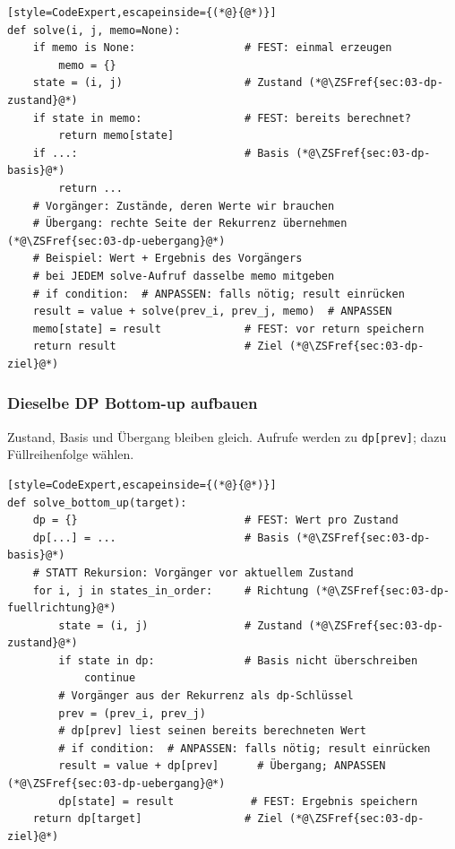 \begin{codebox}
\begin{lstlisting}[style=CodeExpert,escapeinside={(*@}{@*)}]
def solve(i, j, memo=None):
    if memo is None:                 # FEST: einmal erzeugen
        memo = {}
    state = (i, j)                   # Zustand (*@\ZSFref{sec:03-dp-zustand}@*)
    if state in memo:                # FEST: bereits berechnet?
        return memo[state]
    if ...:                          # Basis (*@\ZSFref{sec:03-dp-basis}@*)
        return ...
    # Vorgänger: Zustände, deren Werte wir brauchen
    # Übergang: rechte Seite der Rekurrenz übernehmen (*@\ZSFref{sec:03-dp-uebergang}@*)
    # Beispiel: Wert + Ergebnis des Vorgängers
    # bei JEDEM solve-Aufruf dasselbe memo mitgeben
    # if condition:  # ANPASSEN: falls nötig; result einrücken
    result = value + solve(prev_i, prev_j, memo)  # ANPASSEN
    memo[state] = result             # FEST: vor return speichern
    return result                    # Ziel (*@\ZSFref{sec:03-dp-ziel}@*)
\end{lstlisting}
\end{codebox}

\subsubsection{Dieselbe DP Bottom-up aufbauen}\label{sec:03-dp-bottom-up}

Zustand, Basis und Übergang bleiben gleich. Aufrufe werden zu \texttt{dp[prev]}; dazu Füllreihenfolge  wählen.

\begin{codebox}
\begin{lstlisting}[style=CodeExpert,escapeinside={(*@}{@*)}]
def solve_bottom_up(target):
    dp = {}                          # FEST: Wert pro Zustand
    dp[...] = ...                    # Basis (*@\ZSFref{sec:03-dp-basis}@*)
    # STATT Rekursion: Vorgänger vor aktuellem Zustand
    for i, j in states_in_order:     # Richtung (*@\ZSFref{sec:03-dp-fuellrichtung}@*)
        state = (i, j)               # Zustand (*@\ZSFref{sec:03-dp-zustand}@*)
        if state in dp:              # Basis nicht überschreiben
            continue
        # Vorgänger aus der Rekurrenz als dp-Schlüssel
        prev = (prev_i, prev_j)
        # dp[prev] liest seinen bereits berechneten Wert
        # if condition:  # ANPASSEN: falls nötig; result einrücken
        result = value + dp[prev]      # Übergang; ANPASSEN (*@\ZSFref{sec:03-dp-uebergang}@*)
        dp[state] = result            # FEST: Ergebnis speichern
    return dp[target]                # Ziel (*@\ZSFref{sec:03-dp-ziel}@*)
\end{lstlisting}
\end{codebox}

